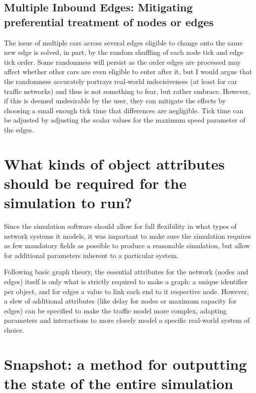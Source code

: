 \subsection{Multiple Inbound Edges:  Mitigating preferential treatment of nodes or edges}
\par The issue of multiple cars across several edges eligible to change onto the same new edge is solved, in part, by the random shuffling of each node tick and edge tick order.  Some randomness will persist as the order edges are processed may affect whether other cars are even eligible to enter after it, but I would argue that the randomness accurately portrays real-world indecisiveness (at least for car traffic networks) and thus is not something to fear, but rather embrace.  However, if this is deemed undesirable by the user, they can mitigate the effects by choosing a small enough tick time that differences are negligible.  Tick time can be adjusted by adjusting the scalar values for the maximum speed parameter of the edges.


\section{What kinds of object attributes should be required for the simulation to run?}

\par Since the simulation software should allow for full flexibility in what types of network systems it models, it was important to make sure the simulation requires as few mandatory fields as possible to produce a reasonable simulation, but allow for additional parameters inherent to a particular system.  \\

\par Following basic graph theory, the essential attributes for the network (nodes and edges) itself is only what is strictly required to make a graph:  a unique identifier per object, and for edges a value to link each end to it respective node. However, a slew of additional attributes (like delay for nodes or maximum capacity for edges) can be specified to make the traffic model more complex, adapting parameters and interactions to more closely model a specific real-world system of choice.



\section{Snapshot:  a method for outputting the state of the entire simulation}

